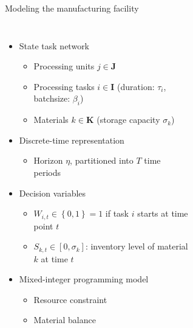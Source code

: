 \documentclass[table]{beamer}
\newcommand{\set}[1]{\left\lbrace #1 \right\rbrace}
\begin{document}
{
\begin{frame}[t]{Modeling the manufacturing facility}
\begin{columns}[T]
\begin{itemize}
\item \alert{State task network}
\begin{itemize}
 \item Processing units $j \in \mathbf{J}$
 \item Processing tasks $i \in \mathbf{I}$ (duration: $\tau_i$,
   batchsize: $\beta_i$)
 \item Materials $k \in \mathbf{K}$ (storage capacity $\sigma_k$)
\end{itemize}
\item \alert{Discrete-time representation}
  \begin{itemize}
    \item Horizon $\eta$, partitioned into $T$ time periods
   \end{itemize}
\item \alert{Decision variables}
  \begin{itemize}
    \item $W_{i,t} \in \set{0,1} = 1$ if task $i$ starts at time point
      $t$
    \item $S_{k,t} \in [0,\sigma_k]$: inventory level of material $k$ at
      time $t$
\end{itemize}
\item \alert{Mixed-integer programming model}
\begin{itemize}
 \item Resource constraint
 \item Material balance
\end{itemize}
\end{itemize}
\begin{figure}
  \centering
  \resizebox{1\columnwidth}{!}{}
\end{figure}

\begin{figure}[h]
  \centering
  \resizebox{1\columnwidth}{!}{}
\end{figure}
\end{columns}
\end{frame}
}
\end{document}
